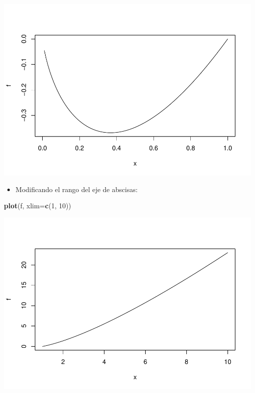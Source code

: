 \documentclass[
]{book}
\newenvironment{Shaded}{\begin{snugshade}}{\end{snugshade}}
\newcommand{\DataTypeTok}[1]{\textcolor[rgb]{0.13,0.29,0.53}{#1}}
\newcommand{\DecValTok}[1]{\textcolor[rgb]{0.00,0.00,0.81}{#1}}
\newcommand{\KeywordTok}[1]{\textcolor[rgb]{0.13,0.29,0.53}{\textbf{#1}}}
\newcommand{\NormalTok}[1]{#1}
\providecommand{\tightlist}{%
  \setlength{\itemsep}{0pt}\setlength{\parskip}{0pt}}
\theoremstyle{definition}
\theoremstyle{definition}
\theoremstyle{definition}
\theoremstyle{remark}
\begin{document}
\begin{center}\includegraphics[width=0.9\linewidth]{07chap06_Graficos_I_files/figure-latex/unnamed-chunk-14-1} \end{center}

\begin{itemize}
\tightlist
\item
  Modificando el rango del eje de abscisas:
\end{itemize}

\begin{Shaded}
\begin{Highlighting}[]
\KeywordTok{plot}\NormalTok{(f, }\DataTypeTok{xlim=}\KeywordTok{c}\NormalTok{(}\DecValTok{1}\NormalTok{, }\DecValTok{10}\NormalTok{))    }
\end{Highlighting}
\end{Shaded}

\begin{center}\includegraphics[width=0.9\linewidth]{07chap06_Graficos_I_files/figure-latex/unnamed-chunk-15-1} \end{center}
\end{document}
